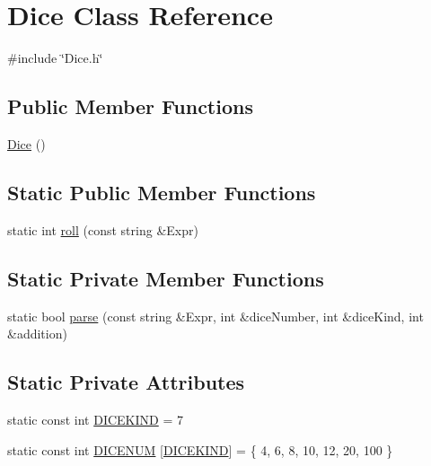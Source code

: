 \hypertarget{class_dice}{}\section{Dice Class Reference}
\label{class_dice}


{\ttfamily \#include \char`\"{}Dice.\+h\char`\"{}}

\subsection*{Public Member Functions}
\begin{DoxyCompactItemize}
\item 
\hyperlink{class_dice_a6b9eadd945ad8fd3840379c8824e5d48_a6b9eadd945ad8fd3840379c8824e5d48}{Dice} ()
\end{DoxyCompactItemize}
\subsection*{Static Public Member Functions}
\begin{DoxyCompactItemize}
\item 
static int \hyperlink{class_dice_a4ca42849612d2c9182f1d93deaa4cfb1_a4ca42849612d2c9182f1d93deaa4cfb1}{roll} (const string \&Expr)
\end{DoxyCompactItemize}
\subsection*{Static Private Member Functions}
\begin{DoxyCompactItemize}
\item 
static bool \hyperlink{class_dice_a7fb1c52019fa79aa3b73e6610da9139c_a7fb1c52019fa79aa3b73e6610da9139c}{parse} (const string \&Expr, int \&dice\+Number, int \&dice\+Kind, int \&addition)
\end{DoxyCompactItemize}
\subsection*{Static Private Attributes}
\begin{DoxyCompactItemize}
\item 
static const int \hyperlink{class_dice_afb857d94c4abede11939a308770ea72b_afb857d94c4abede11939a308770ea72b}{D\+I\+C\+E\+K\+I\+ND} = 7
\item 
static const int \hyperlink{class_dice_a0a00c7ba6e7486d9cbcf7c8c64c65b1a_a0a00c7ba6e7486d9cbcf7c8c64c65b1a}{D\+I\+C\+E\+N\+UM} \mbox{[}\hyperlink{class_dice_afb857d94c4abede11939a308770ea72b_afb857d94c4abede11939a308770ea72b}{D\+I\+C\+E\+K\+I\+ND}\mbox{]} = \{ 4, 6, 8, 10, 12, 20, 100 \}
\end{DoxyCompactItemize}


